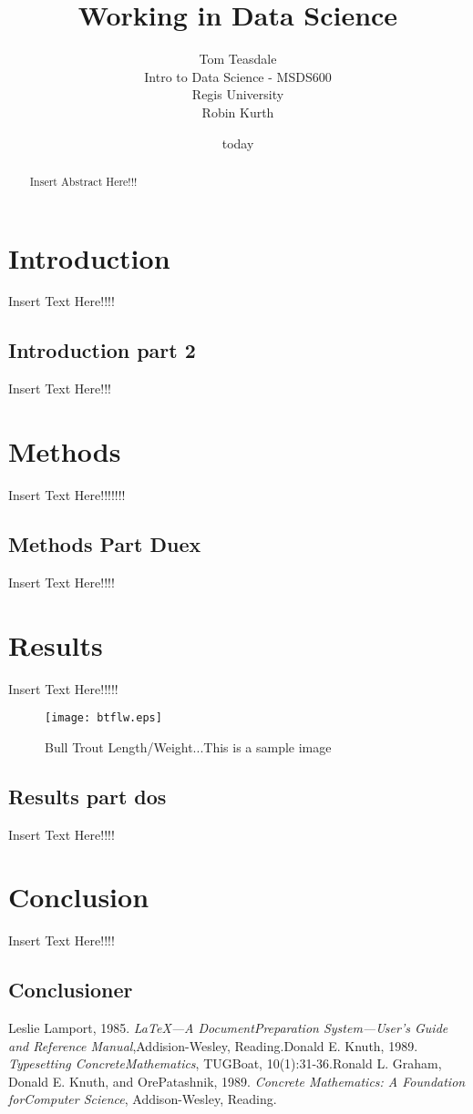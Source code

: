 \documentclass[12pt]{article}
\title{Working in Data Science}
\date{today}
\author{Tom Teasdale\\
	Intro to Data Science -  MSDS600\\
	Regis University\\
	Robin Kurth}
\begin{document}
	\maketitle
\newpage
\tableofcontents
\newpage
\begin{abstract}
Insert Abstract Here!!!
\end{abstract}
\newpage
{}
\section{Introduction}
Insert Text Here!!!!
\subsection{Introduction part 2}
Insert Text Here!!!
\section{Methods}
Insert Text Here!!!!!!!
\subsection{Methods Part Duex}
Insert Text Here!!!!
\section{Results}
Insert Text Here!!!!!
\begin{figure}
\begin{center}
\texttt{[image: btflw.eps]}
\caption{Bull Trout Length/Weight...This is a sample image}
\end{center}
\end{figure}
\subsection{Results part dos}
Insert Text Here!!!!
\section{Conclusion}
Insert Text Here!!!!
\subsection{Conclusioner}
\newpage
\begin{thebibliography}{9}Leslie Lamport, 1985. \emph{\LaTeX---A DocumentPreparation System---User’s Guide and Reference Manual},Addision-Wesley, Reading.Donald E. Knuth, 1989. \emph{Typesetting ConcreteMathematics}, TUGBoat, 10(1):31-36.Ronald L. Graham, Donald E. Knuth, and OrePatashnik, 1989. \emph{Concrete Mathematics: A Foundation forComputer Science}, Addison-Wesley, Reading.\end{thebibliography}
\end{document}
